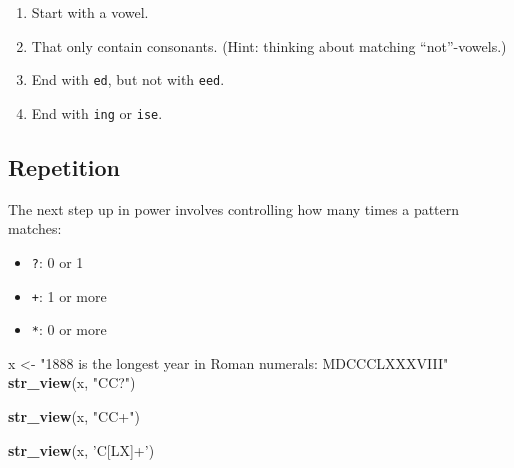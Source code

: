 \documentclass[]{book}
\newenvironment{Shaded}{\begin{snugshade}}{\end{snugshade}}
\newcommand{\KeywordTok}[1]{\textcolor[rgb]{0.13,0.29,0.53}{\textbf{#1}}}
\newcommand{\StringTok}[1]{\textcolor[rgb]{0.31,0.60,0.02}{#1}}
\newcommand{\NormalTok}[1]{#1}
\providecommand{\tightlist}{%
  \setlength{\itemsep}{0pt}\setlength{\parskip}{0pt}}
\begin{document}
\begin{enumerate}
\def\labelenumi{\arabic{enumi}.}
\item
  Start with a vowel.
\item
  That only contain consonants. (Hint: thinking about matching
  ``not''-vowels.)
\item
  End with \texttt{ed}, but not with \texttt{eed}.
\item
  End with \texttt{ing} or \texttt{ise}.
\end{enumerate}

\subsection{Repetition}\label{repetition}

The next step up in power involves controlling how many times a pattern
matches:

\begin{itemize}
\tightlist
\item
  \texttt{?}: 0 or 1
\item
  \texttt{+}: 1 or more
\item
  \texttt{*}: 0 or more
\end{itemize}

\begin{Shaded}
\begin{Highlighting}[]
\NormalTok{x <-}\StringTok{ "1888 is the longest year in Roman numerals: MDCCCLXXXVIII"}
\KeywordTok{str_view}\NormalTok{(x, }\StringTok{"CC?"}\NormalTok{)}
\end{Highlighting}
\end{Shaded}

\hypertarget{htmlwidget-20f0cdc2888b18632cb0}{}

\begin{Shaded}
\begin{Highlighting}[]
\KeywordTok{str_view}\NormalTok{(x, }\StringTok{"CC+"}\NormalTok{)}
\end{Highlighting}
\end{Shaded}

\hypertarget{htmlwidget-acf232f763a6d01286c3}{}

\begin{Shaded}
\begin{Highlighting}[]
\KeywordTok{str_view}\NormalTok{(x, }\StringTok{'C[LX]+'}\NormalTok{)}
\end{Highlighting}
\end{Shaded}

\hypertarget{htmlwidget-6f8d3407f82dc7e2d69a}{}
\end{document}
